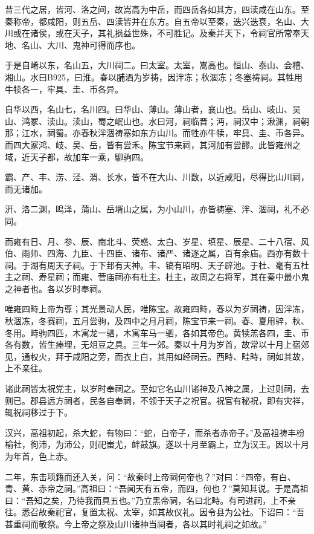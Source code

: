 \documentclass[]{article}
\begin{document}
昔三代之居，皆河、洛之间，故嵩高为中岳，而四岳各如其方，四渎咸在山东。至秦称帝，都咸阳，则五岳、四渎皆并在东方。自五帝以至秦，迭兴迭衰，名山、大川或在诸侯，或在天子，其礼损益世殊，不可胜记。及秦并天下，令祠官所常奉天地、名山、大川、鬼神可得而序也。

于是自崤以东，名山五，大川祠二。曰太室。太室，嵩高也。恒山、泰山、会稽、湘山。水曰B925，曰淮。春以脯酒为岁祷，因泮冻；秋涸冻；冬塞祷祠。其牲用牛犊各一，牢具、圭、币各异。

自华以西，名山七，名川四。曰华山、薄山。薄山者，襄山也。岳山、岐山、吴山、鸿冢、渎山。渎山，蜀之岷山也。水曰河，祠临晋；沔，祠汉中；湫渊，祠朝那；江水，祠蜀。亦春秋泮涸祷塞如东方山川。而牲亦牛犊，牢具、圭、币各异。而四大冢鸿、岐、吴、岳，皆有尝禾。陈宝节来祠，其河加有尝醪。此皆雍州之域，近天子都，故加车一乘，駠驹四。

霸、产、丰、涝、泾、渭、长水，皆不在大山、川数，以近咸阳，尽得比山川祠，而无诸加。

汧、洛二渊，鸣泽，蒲山、岳壻山之属，为小山川，亦皆祷塞、泮、涸祠，礼不必同。

而雍有日、月、参、辰、南北斗、荧惑、太白、岁星、填星、辰星、二十八宿、风伯、雨师、四海、九臣、十四臣、诸布、诸严、诸逐之属，百有余庙。西亦有数十祠。于湖有周天子祠。于下邽有天神。丰、镐有昭明、天子辟池。于杜、毫有五杜主之祠、寿星祠；而雍、菅庙祠亦有杜主。杜主，故周之右将军，其在秦中最小鬼之神者也。各以岁时奉祠。

唯雍四畤上帝为尊；其光景动人民，唯陈宝。故雍四畤，春以为岁祠祷，因泮冻，秋涸冻，冬赛祠，五月尝驹，及四中之月月祠，陈宝节来一祠。春、夏用骍，秋、冬用。畤驹四匹，木寓龙一驷，木寓车马一驷，各如其帝色。黄犊羔各四，圭、币各有数，皆生瘗埋，无俎豆之具。三年一郊。秦以十月为岁首，故常以十月上宿郊见，通权火，拜于咸阳之旁，而衣上白，其用如经祠云。西畤、畦畤，祠如其故，上不亲往。

诸此祠皆太祝党主，以岁时奉祠之。至如它名山川诸神及八神之属，上过则祠，去则已。郡县远方祠者，民各自奉祠，不领于天子之祝官。祝官有秘祝，即有灾祥，辄祝祠移过于下。

汉兴，高祖初起，杀大蛇，有物曰：``蛇，白帝子，而杀者赤帝子。''及高祖祷丰枌榆社，徇沛，为沛公，则祀蚩尤，衅鼓旗。遂以十月至霸上，立为汉王。因以十月为年首，色上赤。

二年，东击项籍而还入关，问：``故秦时上帝祠何帝也？''对曰：``四帝，有白、青、黄、赤帝之祠。''高祖曰：``吾闻天有五帝，而四，何也？''莫知其说。于是高祖曰：``吾知之矣，乃待我而具五也。''乃立黑帝祠，名曰北畤。有司进祠，上不亲往。悉召故秦祀官，复置太祝、太宰，如其故仪礼。因令县为公社。下诏曰：``吾甚重祠而敬祭。今上帝之祭及山川诸神当祠者，各以其时礼祠之如故。''
\end{document}
